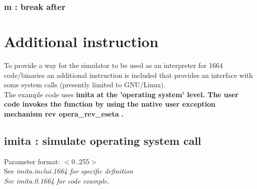 \documentclass[a4paper,11pt]{article}
\begin{document}
\subsubsection{m : break after}

\pagebreak
\section{Additional instruction}
To provide a way for the simulator to be used as an interpreter for 1664 code/binaries an additional instruction is included that provides an interface with some system calls (presently limited to GNU/Linux).\\
The example code uses \bf imita \rm at the 'operating system' level. The user code invokes the function by using the native user exception mechanism \bf rev opera\_rev\_eseta \rm.\\

\subsection{imita : simulate operating system call}
 Parameter format: $<$0..255$>$\\
 See \sl imita.inclui.1664 \rm for specific definition\\
 See \sl imita.0.1664 \rm for code example.\\
\end{document}

